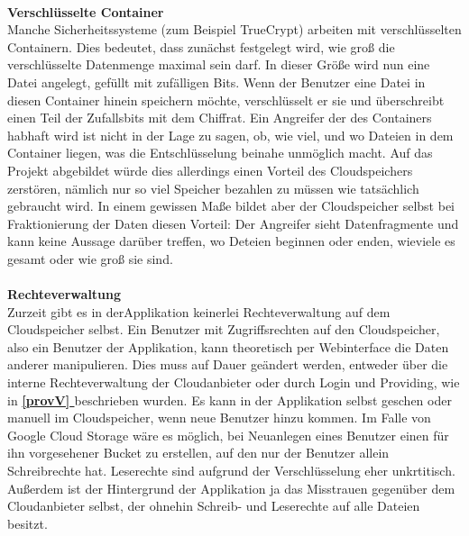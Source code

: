 \documentclass[13pt,a4paper,bibliography=totocnumbered,listof=totocnumbered]{scrartcl}
\newcommand*{\fullref}[1]{\textbf{\hyperref[{#1}]{\ref*{#1} \nameref*{#1}}}}
\begin{document}
\\\textbf{Verschlüsselte Container}\\
Manche Sicherheitssysteme (zum Beispiel TrueCrypt) arbeiten mit verschlüsselten Containern. Dies bedeutet, dass zunächst festgelegt wird, wie groß die verschlüsselte Datenmenge maximal sein darf. In dieser Größe wird nun eine Datei angelegt, gefüllt mit zufälligen Bits. Wenn der Benutzer eine Datei in diesen Container hinein speichern möchte, verschlüsselt er sie und überschreibt einen Teil der Zufallsbits mit dem Chiffrat. Ein Angreifer der des Containers habhaft wird ist nicht in der Lage zu sagen, ob, wie viel, und wo Dateien in dem Container liegen, was die Entschlüsselung beinahe unmöglich macht. Auf das Projekt abgebildet würde dies allerdings einen Vorteil des Cloudspeichers zerstören, nämlich nur so viel Speicher bezahlen zu müssen wie tatsächlich gebraucht wird. In einem gewissen Maße bildet aber der Cloudspeicher selbst bei Fraktionierung der Daten diesen Vorteil: Der Angreifer sieht Datenfragmente und kann keine Aussage darüber treffen, wo Deteien beginnen oder enden, wieviele es gesamt oder wie groß sie sind.\\
\\\textbf{Rechteverwaltung}\\
Zurzeit gibt es in derApplikation keinerlei Rechteverwaltung auf dem Cloudspeicher selbst. Ein Benutzer mit Zugriffsrechten auf den Cloudspeicher, also ein Benutzer der Applikation, kann theoretisch per Webinterface die Daten anderer manipulieren. Dies muss auf Dauer geändert werden, entweder über die interne Rechteverwaltung der Cloudanbieter oder durch Login und Providing, wie in \fullref{provV} beschrieben wurden. Es kann in der Applikation selbst geschen oder manuell im Cloudspeicher, wenn neue Benutzer hinzu kommen. Im Falle von Google Cloud Storage wäre es möglich, bei Neuanlegen eines Benutzer einen für ihn vorgesehener Bucket zu erstellen, auf den nur der Benutzer allein Schreibrechte hat. Leserechte sind aufgrund der Verschlüsselung eher unkrtitisch. Außerdem ist der Hintergrund der Applikation ja das Misstrauen gegenüber dem Cloudanbieter selbst, der ohnehin Schreib- und Leserechte auf alle Dateien besitzt.
\pagebreak


	
{\raggedright 

 
 \nocite{43}
}
\pagebreak
\end{document}

